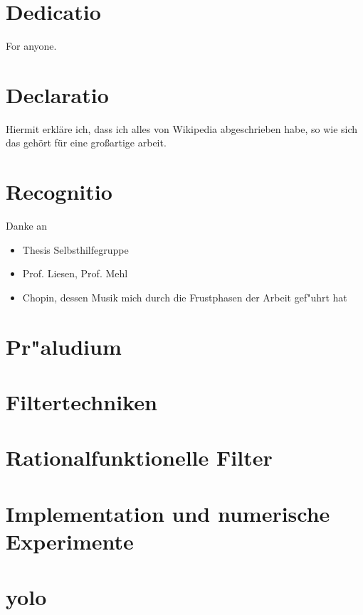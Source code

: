 \documentclass[12pt, twoside]{report} %
\begin{document}


\chapter*{Dedicatio}
For anyone.

\chapter*{Declaratio}
Hiermit erkläre ich, dass ich alles von Wikipedia abgeschrieben habe, so
wie sich das gehört für eine großartige arbeit.

\chapter*{Recognitio}
Danke an
\begin{itemize}
\item Thesis Selbsthilfegruppe
\item Prof. Liesen, Prof. Mehl
\item Chopin, dessen Musik mich durch die Frustphasen der Arbeit gef"uhrt hat
\end{itemize}

\tableofcontents

\chapter{Pr"aludium}%


\chapter{Filtertechniken} %


\chapter{Rationalfunktionelle Filter}


\chapter{Implementation und numerische Experimente}


\chapter{}%


\appendix
\chapter{yolo}


\nocite{*}
\printbibliography
\end{document}
